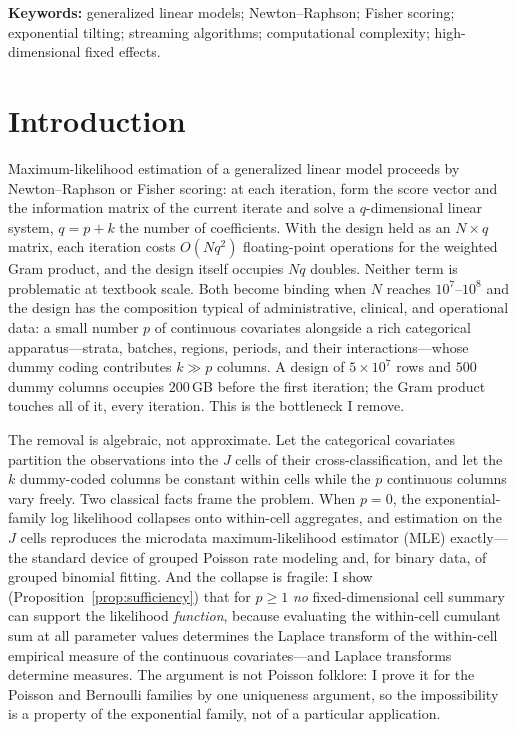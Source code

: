 \documentclass[11pt]{article}
\begin{document}
\medskip
\noindent\textbf{Keywords:} generalized linear models; Newton--Raphson;
Fisher scoring; exponential tilting; streaming algorithms;
computational complexity; high-dimensional fixed effects.

\newpage

\section{Introduction}\label{sec:intro}

Maximum-likelihood estimation of a generalized linear model
\citep{nelder1972,mccullagh1989} proceeds by Newton--Raphson or Fisher
scoring: at each iteration, form the score vector and the information
matrix of the current iterate and solve a $q$-dimensional linear
system, $q = p + k$ the number of coefficients.  With the design held
as an $N \times q$ matrix, each iteration costs $O(Nq^2)$ floating-point
operations for the weighted Gram product, and the design itself
occupies $Nq$ doubles.  Neither term is problematic at textbook scale.
Both become binding when $N$ reaches $10^7$--$10^8$ and the design has
the composition typical of administrative, clinical, and operational
data: a small number $p$ of continuous covariates alongside a rich
categorical apparatus---strata, batches, regions, periods, and their
interactions---whose dummy coding contributes $k \gg p$ columns.  A
design of $5 \times 10^7$ rows and $500$ dummy columns occupies
$200$\,GB before the first iteration; the Gram product touches all of
it, every iteration.  This is the bottleneck I remove.

The removal is algebraic, not approximate.  Let the categorical
covariates partition the observations into the $J$ cells of their
cross-classification, and let the $k$ dummy-coded columns be constant
within cells while the $p$ continuous columns vary freely.  Two
classical facts frame the problem.  When $p = 0$, the exponential-family
log likelihood collapses onto within-cell aggregates, and estimation on
the $J$ cells reproduces the microdata maximum-likelihood estimator
(MLE) exactly---the standard device of grouped Poisson rate modeling
\citep{frome1983,clayton1993,breslow1987} and, for binary data, of
grouped binomial fitting.  And the collapse is fragile: I show
(Proposition~\ref{prop:sufficiency}) that for $p \ge 1$ \emph{no}
fixed-dimensional cell summary can support the likelihood
\emph{function}, because evaluating the within-cell cumulant sum at all
parameter values determines the Laplace transform of the within-cell
empirical measure of the continuous covariates---and Laplace transforms
determine measures.  The argument is not Poisson folklore: I prove it
for the Poisson and Bernoulli families by one uniqueness argument, so
the impossibility is a property of the exponential family, not of a
particular application.
\end{document}
